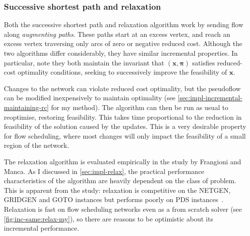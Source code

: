 \subsubsection{Successive shortest path and relaxation}

Both the successive shortest path and relaxation algorithm work by sending flow along \emph{augmenting paths}. These paths start at an excess vertex, and reach an excess vertex traversing only arcs of zero or negative reduced cost. Although the two algorithms differ considerably, they have similar incremental properties. In particular, note they both maintain the invariant that $\left(\mathbf{x},\boldsymbol{\pi}\right)$ satisfies reduced-cost optimality conditions, seeking to successively improve the feasibility of $\mathbf{x}$\footnotemark.

Changes to the network can violate reduced cost optimality, but the pseudoflow can be modified inexpensively to maintain optimality (see \cref{sec:impl-incremental-maintaining-rc} for my method). The algorithm can then be run as usual to reoptimise, restoring feasibility. This takes time proportional to the reduction in feasibility of the solution caused by the updates\footnotemark. This is a very desirable property for flow scheduling, where most changes will only impact the feasibility of a small region of the network.

The relaxation algorithm is evaluated empirically in the study by Frangioni and Manca. As I discussed in \cref{sec:impl-relax}, the practical performance characteristics of the algorithm are heavily dependent on the class of problem. This is apparent from the study: relaxation is competitive on the NETGEN, GRIDGEN and GOTO instances but performs poorly on PDS instances~\cite[tables~1~to~4]{Frangioni:2006}. Relaxation is fast on flow scheduling networks even as a from scratch solver (see \cref{fig:inc-same:relax-my}), so there are reasons to be optimistic about its incremental performance. 

